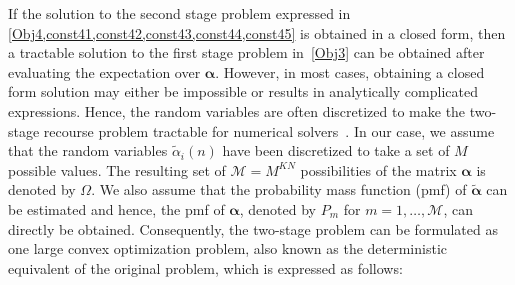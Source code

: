 \documentclass[10pt, letter,twocolumn]{IEEEtran}
\begin{document}
If the solution to the second stage problem expressed in \cref{Obj4,const41,const42,const43,const44,const45} is obtained in a closed form, then a tractable solution to the first stage problem in~\cref{Obj3} can be obtained after evaluating the expectation over $\boldsymbol{\alpha}$. However, in most cases, obtaining a closed form solution may either be impossible or results in analytically complicated expressions. Hence, the random variables are often discretized to make the two-stage recourse problem tractable for numerical solvers~\cite{discretization}. In our case, we assume that the random variables $\tilde{\alpha}_{i}(n)$ have been discretized to take a set of $M$ possible values. The resulting set of $\mathcal{M} = M^{KN}$ possibilities of the matrix $\boldsymbol{\alpha}$ is denoted by $\Omega$. We also assume that the probability mass function (pmf) of $\boldsymbol{\tilde{\alpha}}$ can be estimated and hence, the pmf of $\boldsymbol{\alpha}$, denoted by $P_{m}$ for $m = 1, \ldots, \mathcal{M}$, can directly be obtained. Consequently, the two-stage problem can be formulated as one large convex optimization problem, also known as the deterministic equivalent of the original problem, which is expressed as follows:
\end{document}
